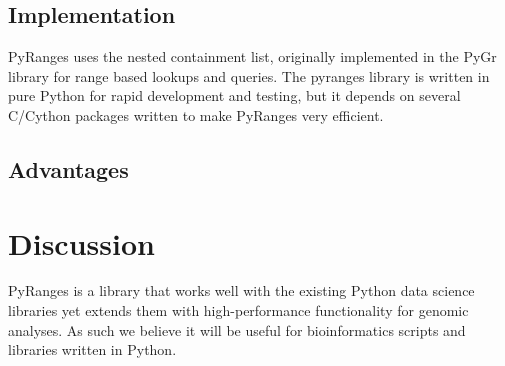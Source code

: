 \documentclass[10pt,letterpaper]{article}
\begin{document}

\subsection*{Implementation}

PyRanges uses the nested containment list, originally implemented in the PyGr
library \cite{doi:10.1093/bioinformatics/btl647} for range based lookups and
queries. The pyranges library is written in pure Python for rapid development
and testing, but it depends on several C/Cython packages written to make
PyRanges very efficient.

\subsection*{Advantages}


\section*{Discussion}

PyRanges is a library that works well with the existing Python data science
libraries yet extends them with high-performance functionality for genomic
analyses. As such we believe it will be useful for bioinformatics scripts and
libraries written in Python.





\end{document}
